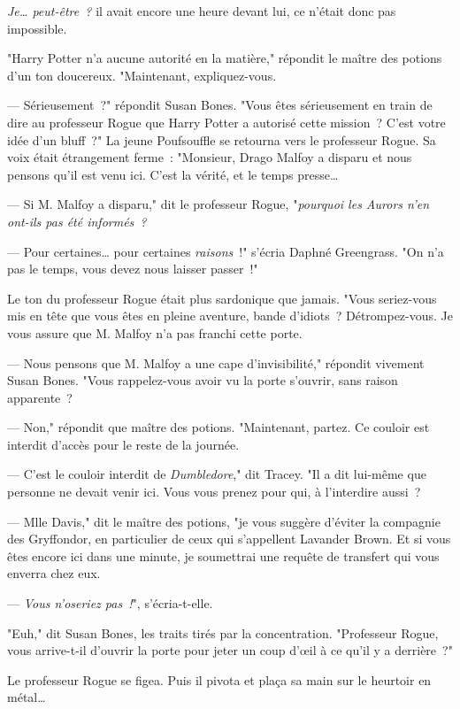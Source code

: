 \emph{Je… peut-être~?} il avait encore une heure devant lui, ce n'était donc pas impossible.

"Harry Potter n'a aucune autorité en la matière," répondit le maître des potions d'un ton doucereux. "Maintenant, expliquez-vous.

--- Sérieusement~?" répondit Susan Bones. "Vous êtes sérieusement en train de dire au professeur Rogue que Harry Potter a autorisé cette mission~? C'est votre idée d'un bluff~?" La jeune Poufsouffle se retourna vers le professeur Rogue. Sa voix était étrangement ferme~: "Monsieur, Drago Malfoy a disparu et nous pensons qu'il est venu ici. C'est la vérité, et le temps presse…

--- Si M. Malfoy a disparu," dit le professeur Rogue, "\emph{pourquoi les Aurors n'en ont-ils pas été informés~?}

--- Pour certaines… pour certaines \emph{raisons}~!" s'écria Daphné Greengrass. "On n'a pas le temps, vous devez nous laisser passer~!"

Le ton du professeur Rogue était plus sardonique que jamais. "Vous seriez-vous mis en tête que vous êtes en pleine aventure, bande d'idiots~? Détrompez-vous. Je vous assure que M. Malfoy n'a pas franchi cette porte.

--- Nous pensons que M. Malfoy a une cape d'invisibilité," répondit vivement Susan Bones. "Vous rappelez-vous avoir vu la porte s'ouvrir, sans raison apparente~?

--- Non," répondit que maître des potions. "Maintenant, partez. Ce couloir est interdit d'accès pour le reste de la journée.

--- C'est le couloir interdit de \emph{Dumbledore}," dit Tracey. "Il a dit lui-même que personne ne devait venir ici. Vous vous prenez pour qui, à l'interdire aussi~?

--- Mlle Davis," dit le maître des potions, "je vous suggère d'éviter la compagnie des Gryffondor, en particulier de ceux qui s'appellent Lavander Brown. Et si vous êtes encore ici dans une minute, je soumettrai une requête de transfert qui vous enverra chez eux.

--- \emph{Vous n'oseriez pas~!}", s'écria-t-elle.

"Euh," dit Susan Bones, les traits tirés par la concentration. "Professeur Rogue, vous arrive-t-il d'ouvrir la porte pour jeter un coup d'œil à ce qu'il y a derrière~?"

Le professeur Rogue se figea. Puis il pivota et plaça sa main sur le heurtoir en métal…

